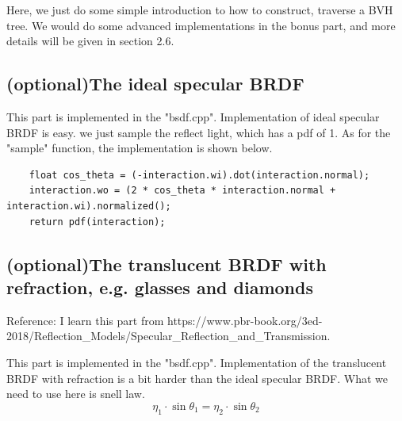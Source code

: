 \documentclass[acmtog]{acmart}
\begin{document}
Here, we just do some simple introduction to how to construct, traverse a BVH tree. We would do some advanced implementations in the bonus part, and more details will be given in section 2.6. 
\begin{figure}[h]
	\centering
\end{figure}

\subsection{(optional)The ideal specular BRDF}
\quad This part is implemented in the "bsdf.cpp". 
Implementation of ideal specular BRDF is easy. we just sample the reflect light, which has a pdf of 1.
As for the "sample" function, the implementation is shown below.
\begin{lstlisting}
	float cos_theta = (-interaction.wi).dot(interaction.normal);
  	interaction.wo = (2 * cos_theta * interaction.normal + interaction.wi).normalized();
	return pdf(interaction);
\end{lstlisting}

\subsection{(optional)The translucent BRDF with refraction, e.g. glasses and diamonds}
Reference: I learn this part from https://www.pbr-book.org/3ed-2018/Reflection\_Models/Specular\_Reflection\_and\_Transmission.

\quad This part is implemented in the "bsdf.cpp". 
Implementation of the translucent BRDF with refraction is a bit harder than the ideal specular BRDF.
What we need to use here is snell law. 
$$\eta_1 \cdot \sin \theta_1 = \eta_2 \cdot \sin \theta_2$$
\end{document}
